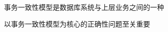 \begin{frame}{}
  \begin{center}
    事务一致性模型是数据库系统与上层业务之间的一种

    \vspace{0.30cm}
  \end{center}
\end{frame}

\begin{frame}{}
  \begin{center}
    以事务一致性模型为核心的正确性问题至关重要

    \vspace{0.30cm}
  \end{center}
\end{frame}

\begin{frame}{}
\end{frame}
